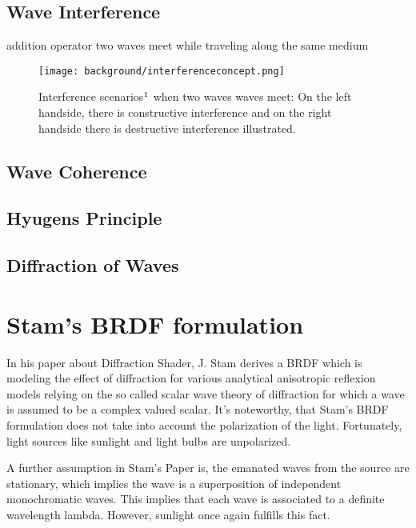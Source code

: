 \subsection{Wave Interference}

addition operator
two waves meet while traveling along the same medium


\begin{figure}[H]
  \centering
  \texttt{[image: background/interferenceconcept.png]}
  \caption[interference]{Interference scenarios$\footnotemark$ when two waves waves meet: On the left handside, there is constructive interference and on the right handside there is destructive interference illustrated.}
  \label{fig:interferenceconcept}
\end{figure}

\subsection{Wave Coherence}

\subsection{Hyugens Principle}
\subsection{Diffraction of Waves}


\section{Stam's BRDF formulation}
\label{sec:sumstam}
In his paper about Diffraction Shader, J. Stam derives a BRDF which is modeling the effect of diffraction for various analytical anisotropic reflexion models relying on the so called scalar wave theory of diffraction for which a wave is assumed to be a complex valued scalar. 
It's noteworthy, that Stam's BRDF formulation does not take into account the polarization of the light. Fortunately, light sources like sunlight and light bulbs are unpolarized. 

A further assumption in Stam's Paper is, the emanated waves from the source are stationary, which implies the wave is a superposition of independent monochromatic waves. This implies that each wave is associated to a definite wavelength lambda. However, sunlight once again fulfills this fact.

